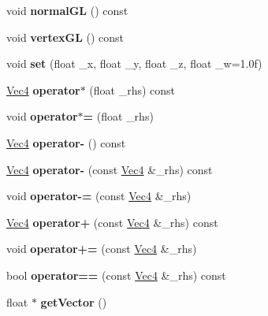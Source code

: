 \begin{DoxyCompactItemize}
\item 
\hypertarget{classVec4_aefca6527cea99964c2075a02de8b341d}{void {\bfseries normal\-G\-L} () const }\label{classVec4_aefca6527cea99964c2075a02de8b341d}

\item 
\hypertarget{classVec4_ae637ea15f081d10860629ec70f95929a}{void {\bfseries vertex\-G\-L} () const }\label{classVec4_ae637ea15f081d10860629ec70f95929a}

\item 
\hypertarget{classVec4_a5d3ac51d77f44f3e098b4a032bcdf65a}{void {\bfseries set} (float \-\_\-x, float \-\_\-y, float \-\_\-z, float \-\_\-w=1.\-0f)}\label{classVec4_a5d3ac51d77f44f3e098b4a032bcdf65a}

\item 
\hypertarget{classVec4_abb32eae8db3a285fee486aeae74e6491}{\hyperlink{classVec4}{Vec4} {\bfseries operator$\ast$} (float \-\_\-rhs) const }\label{classVec4_abb32eae8db3a285fee486aeae74e6491}

\item 
\hypertarget{classVec4_a59181be5e000a07b117390f887c54fa9}{void {\bfseries operator$\ast$=} (float \-\_\-rhs)}\label{classVec4_a59181be5e000a07b117390f887c54fa9}

\item 
\hypertarget{classVec4_abf778c1348447a8dd3715ff83c6d5c09}{\hyperlink{classVec4}{Vec4} {\bfseries operator-\/} () const }\label{classVec4_abf778c1348447a8dd3715ff83c6d5c09}

\item 
\hypertarget{classVec4_ae2579c5b5ce533033325ebd78bf3d544}{\hyperlink{classVec4}{Vec4} {\bfseries operator-\/} (const \hyperlink{classVec4}{Vec4} \&\-\_\-rhs) const }\label{classVec4_ae2579c5b5ce533033325ebd78bf3d544}

\item 
\hypertarget{classVec4_a92e2e5400ea9c6697360462276175034}{void {\bfseries operator-\/=} (const \hyperlink{classVec4}{Vec4} \&\-\_\-rhs)}\label{classVec4_a92e2e5400ea9c6697360462276175034}

\item 
\hypertarget{classVec4_a58014ec694674a8c27587a03037f0f09}{\hyperlink{classVec4}{Vec4} {\bfseries operator+} (const \hyperlink{classVec4}{Vec4} \&\-\_\-rhs) const }\label{classVec4_a58014ec694674a8c27587a03037f0f09}

\item 
\hypertarget{classVec4_a9d7dbf4c6dc031cbed8a0d5938021821}{void {\bfseries operator+=} (const \hyperlink{classVec4}{Vec4} \&\-\_\-rhs)}\label{classVec4_a9d7dbf4c6dc031cbed8a0d5938021821}

\item 
\hypertarget{classVec4_a179aabcc9171e5daeb9d95503ecf86af}{bool {\bfseries operator==} (const \hyperlink{classVec4}{Vec4} \&\-\_\-rhs) const }\label{classVec4_a179aabcc9171e5daeb9d95503ecf86af}

\item 
\hypertarget{classVec4_aa8f64d8ed4846656cb16052f5b575025}{float $\ast$ {\bfseries get\-Vector} ()}\label{classVec4_aa8f64d8ed4846656cb16052f5b575025}

\end{DoxyCompactItemize}
